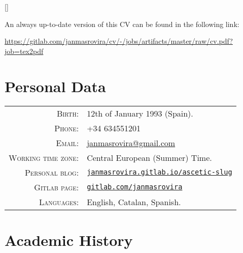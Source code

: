\documentclass[11pt]{article}
\begin{document}
\par{\bigskip\par}
\titleformat{\section}{\Large\scshape\raggedright}{}{0em}{}[\titlerule]

An always up-to-date version of this CV can be found in the following link:
\begin{center}
\url{https://gitlab.com/janmasrovira/cv/-/jobs/artifacts/master/raw/cv.pdf?job=tex2pdf}
\end{center}

\section{Personal Data}

\begin{tabular}{rl}
\textsc{Birth:} & 12th of January 1993 (Spain).\\
\textsc{Phone:} & +34 634551201\\
\textsc{Email:} & \href{mailto:janmasrovira@gmail.com}{janmasrovira@gmail.com} \\
\textsc{Working time zone:} & Central European (Summer) Time.  \\
\textsc{Personal blog:} & \href{https://janmasrovira.gitlab.io/ascetic-slug/}{\texttt{janmasrovira.gitlab.io/ascetic-slug}} \\
\textsc{Gitlab page:} & \href{https://gitlab.com/janmasrovira}{\texttt{gitlab.com/janmasrovira}} \\
\textsc{Languages:} & English, Catalan, Spanish.
\end{tabular}

\section{Academic History}
\end{document}

